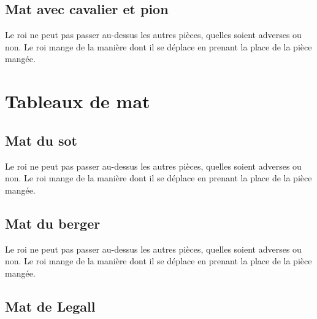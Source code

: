 \documentclass[a5paper,openany,twocolumn]{book}
\begin{document}
{%

\chapter{Mat avec cavalier et pion}

Le roi ne peut pas passer au-dessus les autres pièces, quelles soient adverses ou non. Le roi mange de la manière dont il se déplace en prenant la place de la pièce mangée. 


\part{Tableaux de mat}

\setcounter{chapter}{0}

\chapter{Mat du sot}
 
Le roi ne peut pas passer au-dessus les autres pièces, quelles soient adverses ou non. Le roi mange de la manière dont il se déplace en prenant la place de la pièce mangée. 


\chapter{Mat du berger}
 
Le roi ne peut pas passer au-dessus les autres pièces, quelles soient adverses ou non. Le roi mange de la manière dont il se déplace en prenant la place de la pièce mangée. 


\chapter{Mat de Legall}

}
\end{document}
